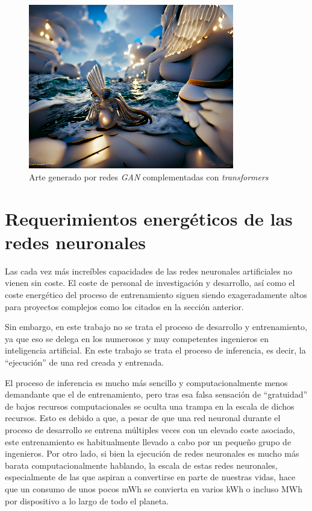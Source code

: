 \begin{figure}[h!]
    \centering
    \includegraphics[width=0.8\textwidth]{img/vqgan_image.png}
    \caption{Arte generado por redes \textit{GAN} complementadas con \textit{transformers}}
    \label{fig:vqgan_image}
\end{figure}

\section{Requerimientos energéticos de las redes neuronales}
\label{sec:requerimientos_energeticos_redes_neuronales}
Las cada vez más increíbles capacidades de las redes neuronales artificiales no vienen sin coste. El coste de personal de investigación y desarrollo, así como el coste energético del proceso de entrenamiento siguen siendo exageradamente altos para proyectos complejos como los citados en la sección anterior.

Sin embargo, en este trabajo no se trata el proceso de desarrollo y entrenamiento, ya que eso se delega en los numerosos y muy competentes ingenieros en inteligencia artificial. En este trabajo se trata el proceso de inferencia, es decir, la ``ejecución'' de una red creada y entrenada.

El proceso de inferencia es mucho más sencillo y computacionalmente menos demandante que el de entrenamiento, pero tras esa falsa sensación de ``gratuidad'' de bajos recursos computacionales se oculta una trampa en la escala de dichos recursos. Esto es debido a que, a pesar de que una red neuronal durante el proceso de desarrollo se entrena múltiples veces con un elevado coste asociado, este entrenamiento es habitualmente llevado a cabo por un pequeño grupo de ingenieros. Por otro lado, si bien la ejecución de redes neuronales es mucho más barata computacionalmente hablando, la escala de estas redes neuronales, especialmente de las que aspiran a convertirse en parte de nuestras vidas, hace que un consumo de unos pocos mWh se convierta en varios kWh o incluso MWh por dispositivo a lo largo de todo el planeta.

